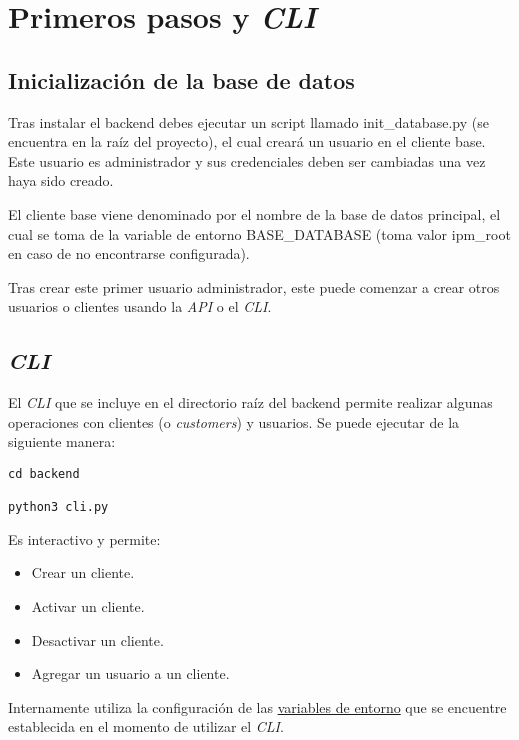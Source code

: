 \chapter{Primeros pasos y \textit{CLI}}

\section{Inicialización de la base de datos}
Tras instalar el backend debes ejecutar un script llamado \textsf{init\_database.py} (se encuentra en la raíz del proyecto), el cual creará un usuario en el cliente base. Este usuario es administrador y sus credenciales deben ser cambiadas una vez haya sido creado.

El cliente base viene denominado por el nombre de la base de datos principal, el cual se toma de la variable de entorno \textsf{BASE\_DATABASE} (toma valor \textsf{ipm\_root} en caso de no encontrarse configurada).

Tras crear este primer usuario administrador, este puede comenzar a crear otros usuarios o clientes usando la \textit{API} o el \textit{CLI}.

\section{\textit{CLI}}

El \textit{CLI} que se incluye en el directorio raíz del backend permite realizar algunas operaciones con clientes (o \textit{customers}) y usuarios. Se puede ejecutar de la siguiente manera:

\begin{lstlisting}
cd backend

python3 cli.py
\end{lstlisting}

Es interactivo y permite:

\begin{itemize}
	\item Crear un cliente.
	\item Activar un cliente.
	\item Desactivar un cliente.
	\item Agregar un usuario a un cliente.
\end{itemize}

Internamente utiliza la configuración de las \hyperref[sec:variables]{variables de entorno} que se encuentre establecida en el momento de utilizar el \textit{CLI}.
